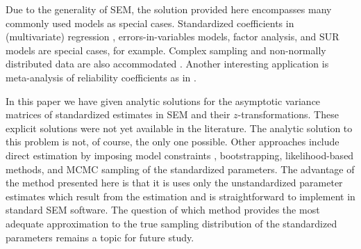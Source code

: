\documentclass[a4paper, 11pt]{article}
\newcommand{\0}{\boldsymbol{0}}
\begin{document}
\vspace{12pt}
Due to the generality of SEM, the solution provided here encompasses many commonly used models as special cases. Standardized
coefficients in (multivariate) regression \citep[discussed in ][121]{bollen1990direct}, errors-in-variables models, factor analysis, and SUR models are special cases, for example. 
Complex sampling and non-normally distributed data are also accommodated  \citep{muthen1995complex}. Another interesting application
is meta-analysis of reliability coefficients as in \cite{andrews_construct_1984,scherpenzeel_validity_1997,saris_estimation_2007,alwin_margins_2007}.


In this paper we have given analytic solutions for the asymptotic variance matrices of standardized estimates in SEM and their 
$z$-transformations. These explicit solutions were not yet available in the literature. The analytic solution to this problem is not, of course, the only  one possible. Other approaches include
direct estimation by imposing model constraints \citep{chan2009testing}, bootstrapping, likelihood-based methods, and MCMC sampling
of the standardized parameters. The advantage of the method presented here is that it is uses only the unstandardized parameter estimates which result from the estimation and is  straightforward to implement in standard SEM software. The question of which 
method provides the most adequate approximation to the true sampling distribution of the standardized parameters  remains
a topic for future study.



\end{document}

